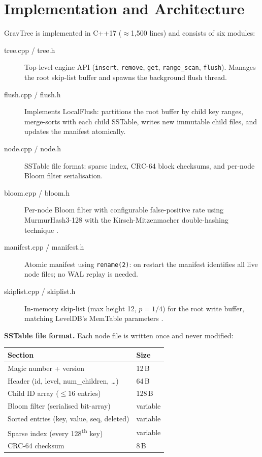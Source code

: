 \documentclass{jors}
\begin{document}
\section*{Implementation and Architecture}

GravTree is implemented in C++17 ($\approx$1,500 lines) and consists of
six modules:

\begin{description}
  \item[tree.cpp / tree.h] Top-level engine API (\texttt{insert},
    \texttt{remove}, \texttt{get}, \texttt{range\_scan}, \texttt{flush}).
    Manages the root skip-list buffer and spawns the background flush
    thread.
  \item[flush.cpp / flush.h] Implements LocalFlush: partitions the root
    buffer by child key ranges, merge-sorts with each child SSTable,
    writes new immutable child files, and updates the manifest atomically.
  \item[node.cpp / node.h] SSTable file format: sparse index, CRC-64
    block checksums, and per-node Bloom filter serialisation.
  \item[bloom.cpp / bloom.h] Per-node Bloom filter with configurable
    false-positive rate using MurmurHash3-128 with the
    Kirsch-Mitzenmacher double-hashing technique \citep{bloom}.
  \item[manifest.cpp / manifest.h] Atomic manifest using
    \texttt{rename(2)}: on restart the manifest identifies all live node
    files; no WAL replay is needed.
  \item[skiplist.cpp / skiplist.h] In-memory skip-list (max height 12,
    $p = 1/4$) for the root write buffer, matching LevelDB's MemTable
    parameters \citep{leveldb}.
\end{description}

\textbf{SSTable file format.} Each node file is written once and never
modified:

\begin{center}
\small
\begin{tabular}{ll}
\toprule
Section & Size \\
\midrule
Magic number + version & 12\,B \\
Header (id, level, num\_children, \ldots) & 64\,B \\
Child ID array ($\leq 16$ entries) & 128\,B \\
Bloom filter (serialised bit-array) & variable \\
Sorted entries (key, value, seq, deleted) & variable \\
Sparse index (every 128\textsuperscript{th} key) & variable \\
CRC-64 checksum & 8\,B \\
\bottomrule
\end{tabular}
\end{center}
\end{document}
